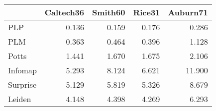 \begin{tabular}{lrrrr}
\toprule
{} & Caltech36 & Smith60 & Rice31 & Auburn71 \\
\midrule
PLP      &     0.136 &   0.159 &  0.176 &    0.286 \\
PLM      &     0.363 &   0.464 &  0.396 &    1.128 \\
Potts    &     1.441 &   1.670 &  1.675 &    2.106 \\
Infomap  &     5.293 &   8.124 &  6.621 &   11.900 \\
Surprise &     5.129 &   5.819 &  5.326 &    8.679 \\
Leiden   &     4.148 &   4.398 &  4.269 &    6.293 \\
\bottomrule
\end{tabular}
